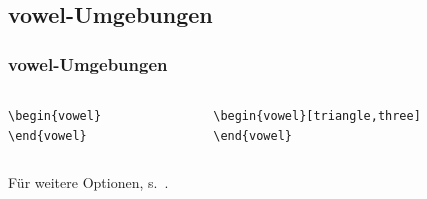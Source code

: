 \subsection{vowel-Umgebungen}

\begin{frame}[fragile]
\frametitle{vowel-Umgebungen}


\begin{columns}
	
\begin{column}{.40\textwidth}
		
\begin{lstlisting}
\begin{vowel}
\end{vowel}
\end{lstlisting}

\begin{figure}
	\centering	
	\begin{vowel}
	\end{vowel}
\end{figure}
		
\end{column}
\begin{column}{.5\textwidth}
		
\begin{lstlisting}
\begin{vowel}[triangle,three]
\end{vowel}
\end{lstlisting}

\begin{figure}
	\centering	
	\begin{vowel}
	\end{vowel}
\end{figure}\end{column}
	
\end{columns}

\vspace{.5cm}

Für weitere Optionen, s.\ \citet{Rei01a}.

\end{frame}


